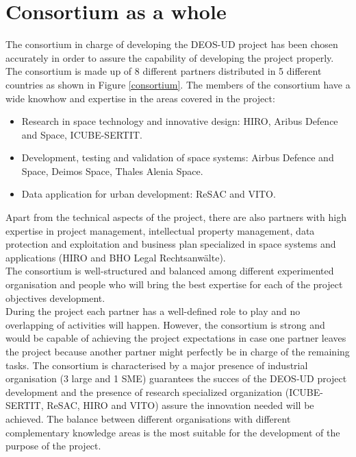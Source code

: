 \section{Consortium as a whole}
The consortium in charge of developing the DEOS-UD project has been chosen accurately in order to assure the capability of developing the project properly.
The consortium is made up of 8 different partners distributed in 5 different countries as shown in Figure \ref{consortium}. The members of the consortium have a wide knowhow and expertise in the areas covered in the project:
\begin{itemize}
\item Research in space technology and innovative design: HIRO, Aribus Defence and Space, ICUBE-SERTIT.
\item Development, testing and validation of space systems: Airbus Defence and Space, Deimos Space, Thales Alenia Space.
\item Data application for urban development: ReSAC and VITO.
\end{itemize} 
Apart from the technical aspects of the project, there are also partners with high expertise in project management, intellectual property management, data protection and exploitation and business plan specialized in space systems and applications (HIRO and BHO Legal Rechtsanwälte).\\
The consortium is well-structured and balanced among different experimented organisation and people who will bring the best expertise for each of the project objectives development.\\
During the project each partner has a well-defined role to play and no overlapping of activities will happen. However, the consortium is strong and would be capable of achieving the project expectations in case one partner leaves the project because another partner might perfectly be in charge of the remaining tasks. The consortium is characterised by a major presence of industrial organisation (3 large and 1 SME) guarantees the succes of the DEOS-UD project development and the presence of research specialized organization (ICUBE-SERTIT, ReSAC, HIRO and VITO) assure the innovation needed will be achieved. The balance between different organisations with different complementary knowledge areas is the most suitable for the development of the purpose of the project.

